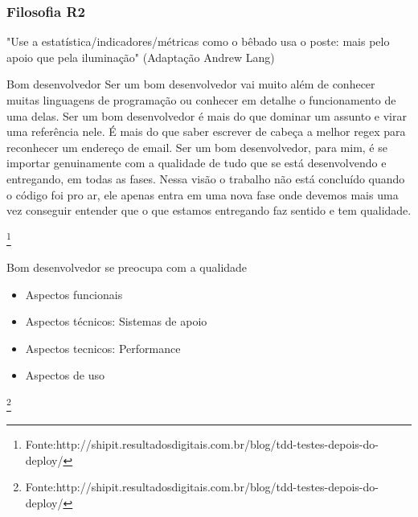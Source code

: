 \begin{frame}
\frametitle{Filosofia R2}
 \begin{block}{}
  "Use a estatística/indicadores/métricas como o bêbado usa o poste:
  mais pelo apoio que pela iluminação" (Adaptação Andrew Lang)
 \end{block}
\end{frame}

\begin{frame}
 \begin{block}{Bom desenvolvedor}
  Ser um bom desenvolvedor vai muito além de conhecer muitas linguagens de programação ou conhecer em detalhe o funcionamento de uma delas.
  Ser um bom desenvolvedor é mais do que dominar um assunto e virar uma referência nele. É mais do que saber escrever de cabeça a melhor
  regex para reconhecer um endereço de email. Ser um bom desenvolvedor, para mim, é se importar genuinamente com a qualidade de tudo
  que se está desenvolvendo e entregando, em todas as fases. Nessa visão o trabalho não está concluído quando o código foi pro ar, ele 
  apenas entra em uma nova fase onde devemos mais uma vez conseguir entender que o que estamos entregando faz sentido e tem qualidade.
 \end{block}
\footnote{Fonte:http://shipit.resultadosdigitais.com.br/blog/tdd-testes-depois-do-deploy/}
\end{frame}

\begin{frame}
 \begin{block}{Bom desenvolvedor se preocupa com a qualidade}
 \begin{itemize}
  \item Aspectos funcionais
  \item Aspectos técnicos: Sistemas de apoio
  \item Aspectos tecnicos: Performance
  \item Aspectos de uso
 \end{itemize}

 \end{block}
\footnote{Fonte:http://shipit.resultadosdigitais.com.br/blog/tdd-testes-depois-do-deploy/}
\end{frame}

